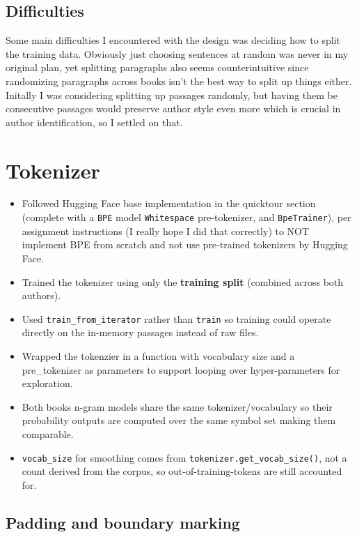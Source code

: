 \documentclass[11pt]{article}
\begin{document}
\subsection{Difficulties}

Some main difficulties I encountered with the design was deciding how to split the training data. Obviously just choosing sentences at random was never in my original plan, yet splitting paragraphs also seems counterintuitive since randomizing paragraphs across books isn't the best way to split up things either. Initally I was considering splitting up passages randomly, but having them be consecutive passages would preserve author style even more which is crucial in author identification, so I settled on that.

\section{Tokenizer}

\begin{itemize}
	\item
	      Followed Hugging Face base implementation in the quicktour section (complete with a \texttt{BPE} model \texttt{Whitespace} pre-tokenizer, and \texttt{BpeTrainer}), per assignment instructions (I really hope I did that correctly) to NOT implement BPE from scratch and not use pre-trained tokenizers by Hugging Face.
	\item
	      Trained the tokenizer using only the \textbf{training split} (combined across both authors).
	\item
	      Used \texttt{train\_from\_iterator} rather than \texttt{train} so training could operate directly on the in-memory passages instead of raw files.
	\item
	      Wrapped the tokenzier in a function with vocabulary size and a pre\_tokenizer as parameters to support looping over hyper-parameters for exploration.
	\item
	      Both books n-gram models share the same tokenizer/vocabulary so their probability outputs are computed over the same symbol set making them comparable.
	\item
	      \texttt{vocab\_size} for smoothing comes from \texttt{tokenizer.get\_vocab\_size()}, not a count derived from the corpus, so out-of-training-tokens are still accounted for.
\end{itemize}

\subsection{Padding and boundary marking}
\end{document}

